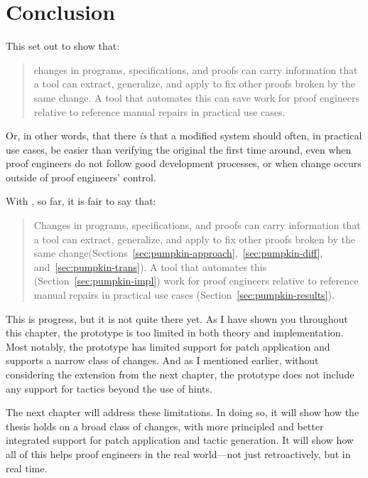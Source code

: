 \section{Conclusion}
\label{sec:pumpkin-concl}

This  set out to show that:

\begin{quote}
changes in programs, specifications, and proofs can carry information that a tool can extract, generalize, and apply to fix other proofs broken by the same change. A tool that automates this can save work for proof engineers relative to reference manual repairs in practical use cases.
\end{quote}
Or, in other words, that there \textit{is}  that  a modified system should often, in practical use cases, be easier than verifying the original the first time around,
even when proof engineers do not follow good development processes,
or when change occurs outside of proof engineers' control.

With \sysname, so far, it is fair to say that:

\begin{quote}
Changes in  programs, specifications, and proofs can carry information that a tool can extract, generalize, and  apply to fix other proofs broken by the same change(Sections~\ref{sec:pumpkin-approach},~\ref{sec:pumpkin-diff}, and~\ref{sec:pumpkin-trans}). A tool that automates this (Section~\ref{sec:pumpkin-impl})  work for proof engineers relative to reference manual repairs in  practical use cases (Section~\ref{sec:pumpkin-results}).
\end{quote}
This is progress, but it is not quite there yet.
As I have shown you throughout this chapter, the \sysname prototype is too limited in both theory and implementation.
Most notably, the \sysname prototype has limited support for patch application and supports
a narrow class of changes.
And as I mentioned earlier, without considering the extension from the next chapter, 
the \sysname prototype does not include any support for tactics beyond the use of hints.

The next chapter will address these limitations.
In doing so, it will show how the thesis holds on a broad class of changes,
with more principled and better integrated support for patch application and tactic generation.
It will show how all of this helps proof engineers in the real world---not just retroactively,
but in real time.





